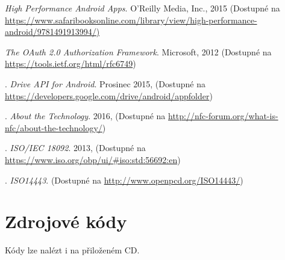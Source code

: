\documentclass{article}
\begin{document}
\begin{thebibliography}{99}



\textit{High Performance Android Apps}. {O'Reilly Media, Inc., 2015}
\newline(Dostupné na \url{https://www.safaribooksonline.com/library/view/high-performance-android/9781491913994/)}

\textit{The OAuth 2.0 Authorization Framework}. {Microsoft, 2012
\newline(Dostupné na \url{https://tools.ietf.org/html/rfc6749})}

.
\textit{Drive API for Android}. {Prosinec 2015,
\newline(Dostupné na \url{https://developers.google.com/drive/android/appfolder})}

.
\textit{About the Technology}. {2016,
\newline(Dostupné na \url{http://nfc-forum.org/what-is-nfc/about-the-technology/})}

.
\textit{ISO/IEC 18092}. {2013,
\newline(Dostupné na \url{https://www.iso.org/obp/ui/#iso:std:56692:en})}


.
\textit{ISO14443}. {
\newline(Dostupné na \url{http://www.openpcd.org/ISO14443/})}

\end{thebibliography}

  \appendix

  \section{Zdrojové kódy}
  Kódy lze nalézt i na přiloženém CD.
\end{document}
